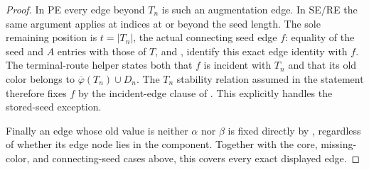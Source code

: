 \begin{proof}
In PE every edge beyond $T_n$ is such an augmentation edge.
In SE/RE the same argument applies at indices at or beyond the seed
length.  The sole remaining position is $t=|T_n|$, the actual connecting
seed edge $f$: equality of the seed and $A$ entries with those of $T$,
and , identify this exact edge identity
with $f$.  The terminal-route helper states both that $f$ is incident
with $T_n$ and that its old color belongs to
$\overline\varphi(T_n)\cup D_n$.
The $T_n$ stability relation assumed in the statement therefore fixes
$f$ by the incident-edge clause of .
This explicitly handles the stored-seed exception.

Finally an edge whose old value is neither $\alpha$ nor $\beta$ is fixed
directly by , regardless of whether its
edge node lies in the component.  Together with the core, missing-color,
and connecting-seed cases above, this covers every exact displayed edge.
\end{proof}
